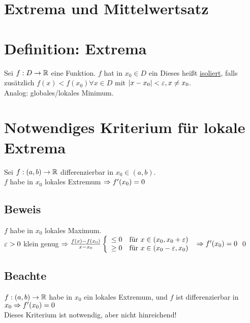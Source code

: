\section*{Extrema und Mittelwertsatz}
\section{Definition: Extrema}\label{11.9}
Sei $f: D \to \mathbb{R}$ eine Funktion. $f$ hat in $x_0 \in D$ ein
Dieses heißt \underline{isoliert}, falls zusätzlich $f(x) < f(x_0) \forall x \in D$ mit $|x-x_0| < \varepsilon, x \neq x_0$.\\
Analog: globales/lokales Minimum.\

\newpage

\section{Notwendiges Kriterium für lokale Extrema}\label{11.10}
Sei $f: (a,b) \to \mathbb{R}$ differenzierbar in $x_0 \in (a,b)$.\\
$f$ habe in $x_0$ lokales Extremum $\Rightarrow f'(x_0) = 0$

\subsection*{Beweis}
$f$ habe in $x_0$ lokales Maximum.\\
$\varepsilon > 0$ klein genug $\Rightarrow \frac{f(x)-f(x_0)}{x-x_0} \left\{\begin{array}{l l} \le 0 & \text{für } x \in (x_0, x_0 + \varepsilon) \\ \ge 0 & \text{für } x \in (x_0-\varepsilon,x_0) \end{array}\right.$
$\Rightarrow f'(x_0) = 0$ \qed\nl
{}

\subsection*{Beachte}
$f: (a,b) \to \mathbb{R}$ habe in $x_0$ ein lokales Extremum, und $f$ ist differenzierbar in $x_0 \Rightarrow f'(x_0) = 0$\\
Dieses Kriterium ist notwendig, aber nicht hinreichend!

